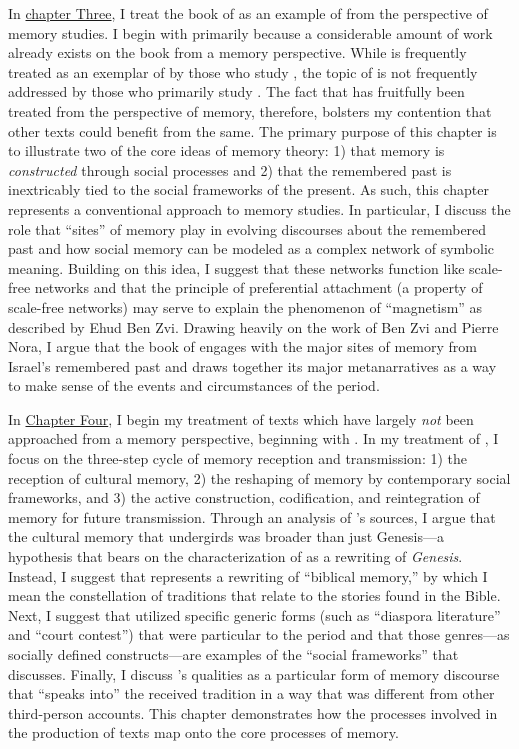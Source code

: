 In \hyperref[chap:chronicles]{chapter Three}, I treat the book of \chronicles as an example of \rwb from the perspective of memory studies. I begin with \chronicles primarily because a considerable amount of work already exists on the book from a memory perspective. While \chronicles is frequently treated as an exemplar of \rwb by those who study \rwb, the topic of \rwb is not frequently addressed by those who primarily study \chronicles. The fact that \chronicles has fruitfully been treated from the perspective of memory, therefore, bolsters my contention that other \rwb texts could benefit from the same. The primary purpose of this chapter is to illustrate two of the core ideas of memory theory: 1) that memory is \emph{constructed} through social processes and 2) that the remembered past is inextricably tied to the social frameworks of the present.  As such, this chapter represents a conventional approach to memory studies. In particular, I discuss the role that ``sites'' of memory play in evolving discourses about the remembered past and how social memory can be modeled as a complex network of symbolic meaning. Building on this idea, I suggest that these networks function like scale-free networks and that the principle of preferential attachment (a property of scale-free networks) may serve to explain the phenomenon of ``magnetism'' as described by Ehud Ben Zvi. Drawing heavily on the work of Ben Zvi and Pierre Nora, I argue that the book of \chronicles engages with the major sites of memory from Israel's remembered past and draws together its major metanarratives as a way to make sense of the events and circumstances of the \secondtemple period.

In \hyperref[chap:ga]{Chapter Four}, I begin my treatment of \rwb texts which have largely \emph{not} been approached from a memory perspective, beginning with \ga. In my treatment of \ga, I focus on the three-step cycle of memory reception and transmission: 1) the reception of cultural memory, 2) the reshaping of memory by contemporary social frameworks, and 3) the active construction, codification, and reintegration of memory for future transmission. Through an analysis of \ga's sources, I argue that the cultural memory that undergirds \ga was broader than just Genesis---a hypothesis that bears on the characterization of \ga as a rewriting of \emph{Genesis}. Instead, I suggest that \ga represents a rewriting of ``biblical memory,'' by which I mean the constellation of traditions that relate to the stories found in the Bible. Next, I suggest that \ga utilized specific generic forms (such as ``diaspora literature'' and ``court contest'') that were particular to the \secondtemple period and that those genres---as socially defined constructs---are examples of the ``social frameworks'' that \halbwachs discusses. Finally, I discuss \ga's \psgraphical qualities as a particular form of memory discourse that ``speaks into'' the received tradition in a way that was different from other third-person accounts. This chapter demonstrates how the processes involved in the production of \rwb texts map onto the core processes of memory.


